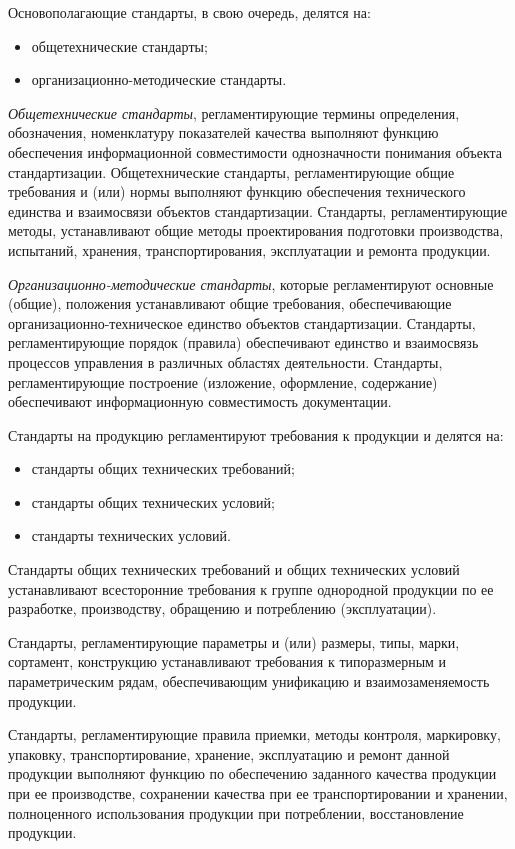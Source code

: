 Основополагающие стандарты, в свою очередь, делятся на:
\begin{itemize}
\item общетехнические стандарты;
\item организационно-методические стандарты.
\end{itemize}

\textit{Общетехнические стандарты}, регламентирующие термины определения, обозначения, номенклатуру показателей качества выполняют функцию обеспечения информационной совместимости однозначности понимания объекта стандартизации. Общетехнические стандарты, регламентирующие общие требования и (или) нормы выполняют функцию обеспечения технического единства и взаимосвязи объектов стандартизации. Стандарты, регламентирующие методы, устанавливают общие методы проектирования подготовки производства, испытаний, хранения, транспортирования, эксплуатации и ремонта продукции.

\textit{Организационно-методические стандарты}, которые регламентируют основные (общие), положения устанавливают общие требования, обеспечивающие организационно-техническое единство объектов стандартизации. Стандарты, регламентирующие порядок (правила) обеспечивают единство и взаимосвязь процессов управления в различных областях деятельности. Стандарты, регламентирующие построение (изложение, оформление, содержание) обеспечивают информационную совместимость документации.

Стандарты на продукцию регламентируют требования к продукции и делятся на:
\begin{itemize}
\item стандарты общих технических требований;
\item стандарты общих технических условий;
\item стандарты технических условий.
\end{itemize}

Стандарты общих технических требований и общих технических условий устанавливают всесторонние требования к группе однородной продукции по ее разработке, производству, обращению и потреблению (эксплуатации).

Стандарты, регламентирующие параметры и (или) размеры, типы, марки, сортамент, конструкцию устанавливают требования к типоразмерным и параметрическим рядам, обеспечивающим унификацию и взаимозаменяемость продукции.

Стандарты, регламентирующие правила приемки, методы контроля, маркировку, упаковку, транспортирование, хранение, эксплуатацию и ремонт данной продукции выполняют функцию по обеспечению заданного качества продукции при ее производстве, сохранении качества при ее транспортировании и хранении, полноценного использования продукции при потреблении, восстановление продукции.

